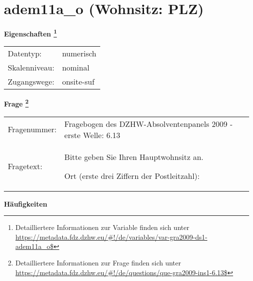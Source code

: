 
    \setcounter{footnote}{0}

    \vspace*{-1.8cm}
	\section{adem11a\_o (Wohnsitz: PLZ)}
	\label{section:adem11a_o}



    \vspace*{0.5cm}
    \noindent\textbf{Eigenschaften
	\footnote{Detailliertere Informationen zur Variable finden sich unter
		\url{https://metadata.fdz.dzhw.eu/\#!/de/variables/var-gra2009-ds1-adem11a_o$}}}\\
	\begin{tabularx}{\hsize}{@{}lX}
	Datentyp: & numerisch \\
	Skalenniveau: & nominal \\
	Zugangswege: &
	  onsite-suf
 \\
    \end{tabularx}



				\vspace*{0.5cm}
                \noindent\textbf{Frage
	                \footnote{Detailliertere Informationen zur Frage finden sich unter
		              \url{https://metadata.fdz.dzhw.eu/\#!/de/questions/que-gra2009-ins1-6.13$}}}\\
				\begin{tabularx}{\hsize}{@{}lX}
					Fragenummer: &
					  Fragebogen des DZHW-Absolventenpanels 2009 - erste Welle:
					  6.13
 \\
					Fragetext: & Bitte geben Sie Ihren Hauptwohnsitz an.\par  Ort (erste drei Ziffern der Postleitzahl): \\
				\end{tabularx}





        		\vspace*{0.5cm}
                \noindent\textbf{Häufigkeiten}

